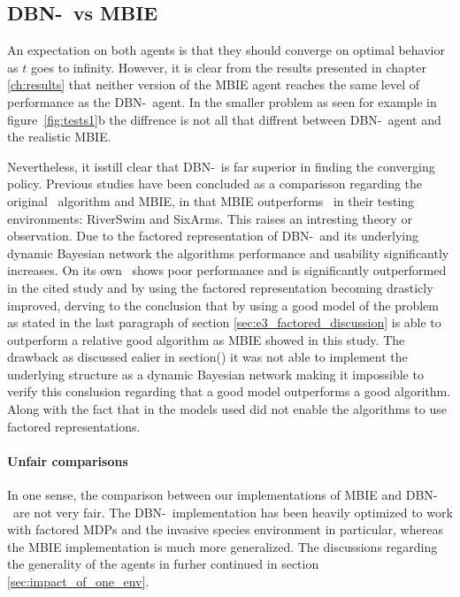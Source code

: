 \subsection{DBN-\etre\ vs MBIE }
An expectation on both agents is that they should converge on optimal behavior
as $t$ goes to infinity. However, it is clear from the results presented in
chapter \ref{ch:results} that neither version of the MBIE agent reaches the
same level of performance as the DBN-\etre\ agent. In the smaller problem as
seen for example in figure~\ref{fig:tests1}b the diffrence is not all that
diffrent between DBN-\etre\ agent and the realistic MBIE. 

Nevertheless, it isstill clear that DBN-\etre\ is far superior in finding the converging policy.
Previous studies have been concluded as a comparisson regarding the original
\etre\ algorithm and MBIE, in \textcite{strehl2004empirical} that MBIE
outperforms \etre\ in their testing environments: RiverSwim and SixArms. This raises an intresting theory or observation. Due to the factored representation of DBN-\etre\ and its underlying dynamic Bayesian network the algorithms performance and usability significantly increases. On its own \etre\ shows poor performance and is significantly outperformed in the cited study and by using the factored representation becoming drasticly improved, derving to the conclusion that by using a good model of the problem as stated in the last paragraph of section \ref{sec:e3_factored_discussion} is able to outperform a relative good algorithm as MBIE showed in this study. The drawback as discussed ealier in section() it was not able to implement the underlying structure as a dynamic Bayesian network making it impossible to verify this conslusion regarding that a good model outperforms a good algorithm. Along with the fact that in \textcite{strehl2004empirical} the models used did not enable the algorithms to use factored representations.


\paragraph{Unfair comparisons}
In one sense, the comparison between our implementations of MBIE and DBN-\etre\
are not very fair. The DBN-\etre\ implementation has been heavily optimized to
work with factored MDPs and the invasive species environment in particular,
whereas the MBIE implementation is much more generalized. The discussions
regarding the generality of the agents in furher continued in section
\ref{sec:impact_of_one_env}. 

